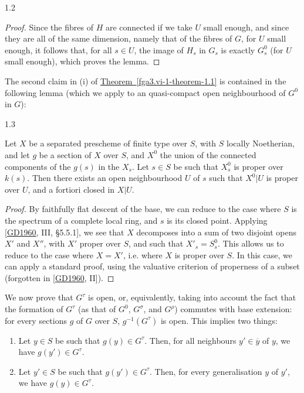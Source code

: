 \begin{lemma}{1.2}
\begin{proof}
      Since the fibres of \(H\) are connected if we take \(U\) small enough, and since they are all of the same dimension, namely that of the fibres of \(G\), for \(U\) small enough, it follows that, for all \(s\in  U\), the image of \(H_s\) in \(G_s\) is exactly \(G_s^0\) (for \(U\) small enough), which proves the lemma.\end{proof}\end{lemma}\par{}The second claim in (i) of \hyperref[fga3.vi-1-theorem-1.1]{Theorem~\ref*{fga3.vi-1-theorem-1.1}} is contained in the following lemma (which we apply to an quasi-compact open neighbourhood of \(G^0\) in \(G\)):\begin{lemma}{1.3}\label{fga3.vi-1-lemma-1.3}\skipsinglepar\par{}Let \(X\) be a separated prescheme of finite type over \(S\), with \(S\) locally Noetherian, and let \(g\) be a section of \(X\) over \(S\), and \(X^0\) the union of the connected components of the \(g(s)\) in the \(X_s\).
    Let \(s\in  S\) be such that \(X_s^0\) is proper over \(k(s)\).
    Then there exists an open neighbourhood \(U\) of \(s\) such that \(X^0|U\) is proper over \(U\), and a fortiori closed in \(X|U\).\begin{proof}\par{}By faithfully flat descent of the base, we can reduce to the case where \(S\) is the spectrum of a complete local ring, and \(s\) is its closed point.
      Applying [\hyperref[GD1960]{GD1960}, III, §5.5.1], we see that \(X\) decomposes into a sum of two disjoint opens \(X'\) and \(X''\), with \(X'\) proper over \(S\), and such that \(X'_s=S_s^0\).
      This allows us to reduce to the case where \(X=X'\), i.e. where \(X\) is proper over \(S\).
      In this case, we can apply a standard proof, using the valuative criterion of properness of a subset (forgotten in [\hyperref[GD1960]{GD1960}, II]).\end{proof}\end{lemma}\par{}We now prove that \(G^\tau \) is open, or, equivalently, taking into account the fact that the formation of \(G^\tau \) (as that of \(G^0\), \(G^\sigma \), and \(G^\rho \)) commutes with base extension: for every sections \(g\) of \(G\) over \(S\), \(g^{-1}(G^\tau )\) is open.
  This implies two things:
  
  
 \begin{enumerate}
    
 \item[a.]
      Let \(y\in  S\) be such that \(g(y)\in  G^\tau \).
      Then, for all neighbours \(y'\in \overline {y}\) of \(y\), we have \(g(y')\in  G^\tau \).
    

    
 \item[b.]
      Let \(y'\in  S\) be such that \(g(y')\in  G^\tau \).
      Then, for every generalisation \(y\) of \(y'\), we have \(g(y)\in  G^\tau \).
    

  \end{enumerate}


